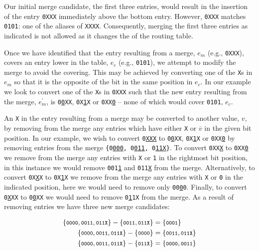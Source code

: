 \documentclass[conference]{IEEEtran}
\newcommand{\mytt}[1]{\texttt{\footnotesize#1}}
\begin{document}
  \noindent Our initial merge candidate, the first three entries, would result in the insertion of the entry \mytt{0XXX} immediately above the bottom entry.
  However, \mytt{0XXX} matches \mytt{0101}: one of the aliases of \mytt{XXXX}.
  Consequently, merging the first three entries as indicated is not allowed as it changes the  of the routing table.

  Once we have identified that the entry resulting from a merge, $e_m$ (e.g., \mytt{0XXX}), covers an entry lower in the table, $e_c$ (e.g., \mytt{0101}), we attempt to modify the merge to avoid the covering.
  This may be achieved by converting one of the \mytt{X}s in $e_m$ so that it is the opposite of the bit in the same position in $e_c$.
  In our example we look to convert one of the \mytt{X}s in \mytt{0XXX} such that the new entry resulting from the merge, $e_m^\prime$, is \mytt{0\underline{0}XX}, \mytt{0X\underline{1}X} or \mytt{0XX\underline{0}} -- none of which would cover \mytt{0101}, $e_c$.
  
  An \mytt{X} in the entry resulting from a merge may be converted to another value, $v$, by removing from the merge any entries which have either \mytt{X} or $\overline{v}$ in the given bit position.
  In our example, we wish to convert \mytt{0\underline{XXX}} to \mytt{0\underline{0}XX}, \mytt{0X\underline{1}X} or \mytt{0XX\underline{0}} by removing entries from the merge \mytt{\{0\underline{000}, 0\underline{011}, 0\underline{11X}\}}.
  To convert \mytt{0XX\underline{X}} to \mytt{0XX\underline{0}} we remove from the merge any entries with \mytt{X} or \mytt{1} in the rightmost bit position, in this instance we would remove \mytt{001\underline{1}} and \mytt{011\underline{X}} from the merge.
  Alternatively, to convert \mytt{0X\underline{X}X} to \mytt{0X\underline{1}X} we remove from the merge any entries with \mytt{X} or \mytt{0} in the indicated position, here we would need to remove only \mytt{00\underline{0}0}.
  Finally, to convert \mytt{0\underline{X}XX} to \mytt{0\underline{0}XX} we would need to remove \mytt{0\underline{1}1X} from the merge.
  As a result of removing entries we have three new merge candidates:\nopagebreak
  
  \begin{align*}
    \{\mbox{\mytt{0000}}, \mbox{\mytt{0011}}, \mbox{\mytt{011X}}\} -
    \{\mbox{\mytt{0011}}, \mbox{\mytt{011X}}\} &= \{\mbox{\mytt{0001}}\} \\
    \{\mbox{\mytt{0000}}, \mbox{\mytt{0011}}, \mbox{\mytt{011X}}\} -
    \{\mbox{\mytt{0000}}\} &= \{\mbox{\mytt{0011}}, \mbox{\mytt{011X}}\} \\
    \{\mbox{\mytt{0000}}, \mbox{\mytt{0011}}, \mbox{\mytt{011X}}\} -
    \{\mbox{\mytt{011X}}\} &= \{\mbox{\mytt{0000}}, \mbox{\mytt{0011}}\} \\
  \end{align*}
  
\end{document}
